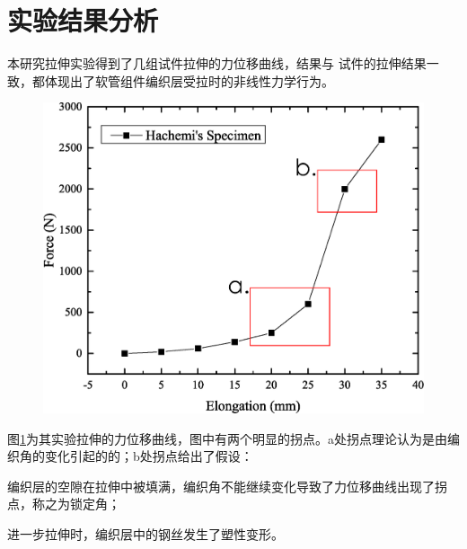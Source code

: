 \section{实验结果分析}

本研究拉伸实验得到了几组试件拉伸的力位移曲线，结果与
\citeauthor{Hachemi2011}试件的拉伸结果一致，都体现出了软管组件编织层受拉时的非线性力学行为。


\begin{figure}[!htb]
	\centering
	\includegraphics[height=0.25\textheight]{figure/experiment/Hachemi-Result-ex}
	\label{fig:Hachemi-Result-ex}
\end{figure}

图\ref{fig:Hachemi-Result-ex}为其实验拉伸的力位移曲线，图中有两个明显的拐点。a处拐点理论认为是由编织角的变化引起的的；b处拐点\cite{Hachemi2011}给出了假设：
\begin{compactenum}
\item 编织层的空隙在拉伸中被填满，编织角不能继续变化导致了力位移曲线出现了拐点，称之为锁定角；
\item 进一步拉伸时，编织层中的钢丝发生了塑性变形。
\end{compactenum}




